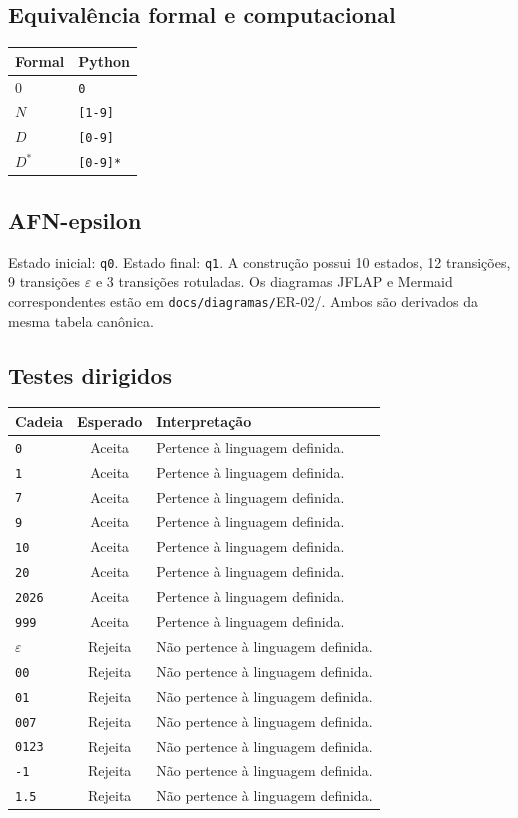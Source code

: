 \documentclass[12pt,a4paper,oneside]{report}
\begin{document}
\subsection{Equivalência formal e computacional}
\begin{center}
\small
\begin{tabular}{|p{}|p{}|}
\toprule
Formal & Python \\
\midrule
$0$ & \texttt{0} \\
$N$ & \texttt{[1-9]} \\
$D$ & \texttt{[0-9]} \\
$D^*$ & \texttt{[0-9]*} \\
\bottomrule
\end{tabular}
\end{center}
\subsection{AFN-epsilon}
Estado inicial: \texttt{q0}. Estado final: \texttt{q1}. A construção possui 10 estados, 12 transições, 9 transições $\varepsilon$ e 3 transições rotuladas.
Os diagramas JFLAP e Mermaid correspondentes estão em \texttt{docs/diagramas/}ER-02/. Ambos são derivados da mesma tabela canônica.
\subsection{Testes dirigidos}
\begin{center}
\small
\begin{tabular}{|p{}|c|p{}|}
\toprule
Cadeia & Esperado & Interpretação \\
\midrule
\texttt{0} & Aceita & Pertence à linguagem definida. \\
\texttt{1} & Aceita & Pertence à linguagem definida. \\
\texttt{7} & Aceita & Pertence à linguagem definida. \\
\texttt{9} & Aceita & Pertence à linguagem definida. \\
\texttt{10} & Aceita & Pertence à linguagem definida. \\
\texttt{20} & Aceita & Pertence à linguagem definida. \\
\texttt{2026} & Aceita & Pertence à linguagem definida. \\
\texttt{999} & Aceita & Pertence à linguagem definida. \\
$\varepsilon$ & Rejeita & Não pertence à linguagem definida. \\
\texttt{00} & Rejeita & Não pertence à linguagem definida. \\
\texttt{01} & Rejeita & Não pertence à linguagem definida. \\
\texttt{007} & Rejeita & Não pertence à linguagem definida. \\
\texttt{0123} & Rejeita & Não pertence à linguagem definida. \\
\texttt{-1} & Rejeita & Não pertence à linguagem definida. \\
\texttt{1.5} & Rejeita & Não pertence à linguagem definida. \\
\bottomrule
\end{tabular}
\end{center}
\end{document}
